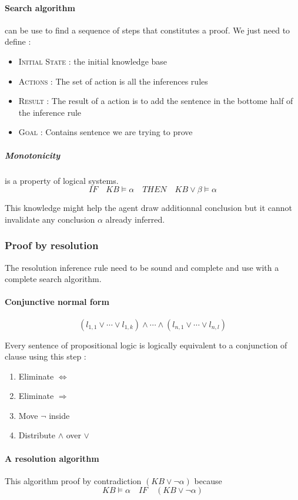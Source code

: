 \paragraph{Search algorithm} can be use to find a sequence of steps that constitutes a proof.
We just need to define : 
\begin{itemize}
    \item \textsc{Initial State} : the initial knowledge base
    \item \textsc{Actions} : The set of action is all the inferences rules
    \item \textsc{Result} : The result of a action is to add the sentence in the bottome half of the inference rule
    \item \textsc{Goal} : Contains sentence we are trying to prove
\end{itemize}

\subparagraph{\textbf{Monotonicity}} is a property of logical systems.
$$ IF \quad KB \models \alpha \quad THEN \quad KB \vee \beta \models \alpha$$

This knowledge might  help the agent draw additionnal  conclusion but it
cannot invalidate any conclusion $\alpha$ already inferred.


\subsubsection{Proof by resolution}
The resolution inference rule need to be sound and complete and use with a 
complete search algorithm.

\paragraph{Conjunctive normal form} 
$$(l_{1,1} \vee \cdots \vee l_{1,k}) \wedge \cdots \wedge (l_{n,1} \vee \cdots \vee l_{n,l})$$

Every sentence of propositional logic is logically equivalent to a conjunction of clause using this step :
\begin{enumerate}
    \item Eliminate $\Leftrightarrow$
    \item Eliminate $\Rightarrow$
    \item Move $\neg$ inside
    \item Distribute $\wedge$ over $\vee$
\end{enumerate}

\paragraph{A resolution algorithm}
This algorithm proof by contradiction $(KB \vee \neg \alpha)$ because $$KB \models \alpha \quad
 IF \quad (KB \vee \neg \alpha)$$

